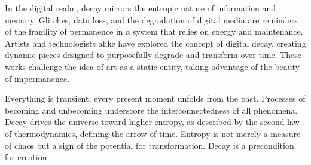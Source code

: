 In the digital realm, decay mirrors the entropic nature of information and memory. Glitches, data loss, and the degradation of digital media are reminders of the fragility of permanence in a system that relies on energy and maintenance. Artists and technologists alike have explored the concept of digital decay, creating dynamic pieces designed to purposefully degrade and transform over time. These works challenge the idea of art as a static entity, taking advantage of the beauty of impermanence.

Everything is transient, every present moment unfolds from the past. Processes of becoming and unbecoming underscore the interconnectedness of all phenomena. Decay drives the universe toward higher entropy, as described by the second law of thermodynamics, defining the arrow of time. Entropy is not merely a measure of chaos but a sign of the potential for transformation. Decay is a precondition for creation.






